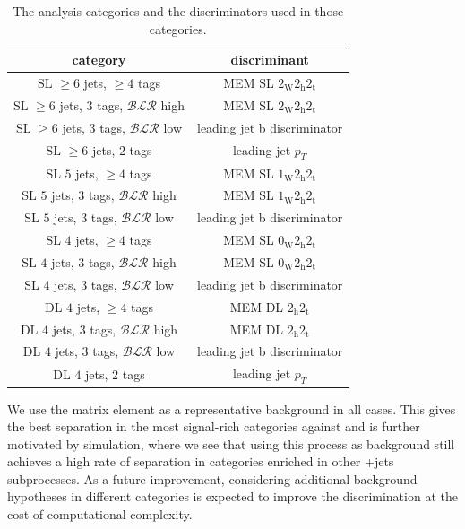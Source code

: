 \begin{table}[h!]
\begin{center}
\caption{The analysis categories and the discriminators used in those categories.}
\label{tab:cat_discriminant}
\begin{tabular}{c|c}
\hline
category & discriminant \\
\hline
SL $\ge6$ jets, $\ge4$ tags & MEM SL $2_{\mathrm{W}} 2_{\mathrm{h}} 2_{\mathrm{t}}$ \\
SL $\ge6$ jets, $3$ tags, $\mathcal{BLR}$ high & MEM SL $2_{\mathrm{W}} 2_{\mathrm{h}} 2_{\mathrm{t}}$ \\
SL $\ge6$ jets, $3$ tags, $\mathcal{BLR}$ low & leading jet b discriminator \\
SL $\ge6$ jets, $2$ tags & leading jet $p_T$ \\
\hline
SL $5$ jets, $\ge4$ tags & MEM SL $1_{\mathrm{W}} 2_{\mathrm{h}} 2_{\mathrm{t}}$ \\
SL $5$ jets, $3$ tags, $\mathcal{BLR}$ high & MEM SL $1_{\mathrm{W}} 2_{\mathrm{h}} 2_{\mathrm{t}}$ \\
SL $5$ jets, $3$ tags, $\mathcal{BLR}$ low & leading jet b discriminator \\
\hline
SL $4$ jets, $\ge4$ tags & MEM SL $0_{\mathrm{W}} 2_{\mathrm{h}} 2_{\mathrm{t}}$ \\
SL $4$ jets, $3$ tags, $\mathcal{BLR}$ high & MEM SL $0_{\mathrm{W}} 2_{\mathrm{h}} 2_{\mathrm{t}}$ \\
SL $4$ jets, $3$ tags, $\mathcal{BLR}$ low & leading jet b discriminator \\
\hline
DL $4$ jets, $\ge4$ tags & MEM DL $2_{\mathrm{h}} 2_{\mathrm{t}}$ \\
DL $4$ jets, $3$ tags, $\mathcal{BLR}$ high & MEM DL $2_{\mathrm{h}} 2_{\mathrm{t}}$ \\
DL $4$ jets, $3$ tags, $\mathcal{BLR}$ low & leading jet b discriminator \\
DL $4$ jets, $2$ tags & leading jet $p_T$ \\
\hline
\hline
\end{tabular}
\end{center}
\end{table}

We use the \ttbb matrix element as a representative background in all cases. This gives the best separation in the most signal-rich categories against \ttbb and is further motivated by simulation, where we see that using this process as background still achieves a high rate of separation in categories enriched in other \ttbar+jets subprocesses. As a future improvement, considering additional background hypotheses in different categories is expected to improve the discrimination at the cost of computational complexity.

